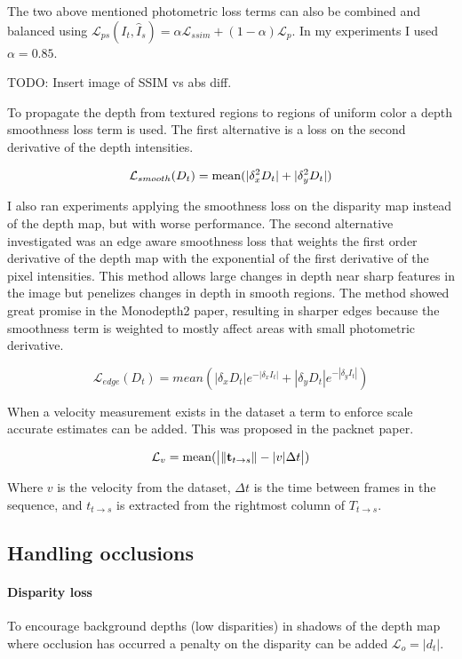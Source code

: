 The two above mentioned photometric loss terms can also be combined and balanced using $ \mathcal{L}_{ps}(I_t, \hat{I}_s) = \alpha \mathcal{L}_{ssim} + (1-\alpha) \mathcal{L}_p $. In my experiments I used $\alpha=0.85$.

TODO: Insert image of SSIM vs abs diff.


To propagate the depth from textured regions to regions of uniform color a depth smoothness loss term is used. The first alternative is a loss on the second derivative of the depth intensities.

\[
\mathcal{L}_{smooth}(D_t)=\operatorname{mean}(|\delta_x^2 D_t|+|\delta_y^2 D_t|)
\]

I also ran experiments applying the smoothness loss on the disparity map instead of the depth map, but with worse performance. The second alternative investigated was an edge aware smoothness loss that weights the first order derivative of the depth map with the exponential of the first derivative of the pixel intensities. This method allows large changes in depth near sharp features in the image but penelizes changes in depth in smooth regions. The method showed great promise in the Monodepth2 paper, resulting in sharper edges because the smoothness term is weighted to mostly affect areas with small photometric derivative.

\[
\mathcal{L}_{edge}(D_t)=mean(|\delta_x D_t|e^{-|\delta_x I_t|} + |\delta_y D_t|e^{-|\delta_y I_t|})
\]

When a velocity measurement exists in the dataset a term to enforce scale accurate estimates can be added. This was proposed in the packnet paper\cite{packnet}.

\[
\mathcal{L}_{v} = \operatorname{mean}(\bigr{|} \| \textbf{t}_{t \rightarrow s} \| - |v|\Delta t \bigr{|})
\]

Where $v$ is the velocity from the dataset, $\Delta t$ is the time between frames in the sequence, and $t_{t\rightarrow s}$ is extracted from the rightmost column of $T_{t\rightarrow s}$.

\subsection{Handling occlusions}
\label{sec:occlusion}

\paragraph{Disparity loss} To encourage background depths (low disparities) in shadows of the depth map where occlusion has occurred a penalty on the disparity can be added $ \mathcal{L}_{o} =|d_t|. $

